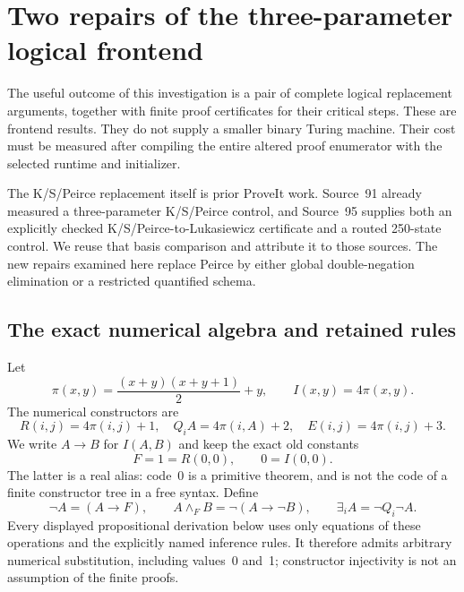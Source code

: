 \newcommand{\ksI}[2]{(#1\mathbin{\to}#2)}
\newcommand{\ksN}[1]{\neg #1}
\newcommand{\ksQ}[2]{Q_{#1}#2}
\newcommand{\ksD}[1]{\mathsf{D}(#1)}
\newcommand{\ksV}[2]{\mathsf{V}_{#1}(#2)}
\newcommand{\ksAnd}{\mathbin{\wedge_F}}

\section{Two repairs of the three-parameter logical frontend}
\label{sec:ksrepairs}

The useful outcome of this investigation is a pair of complete logical
replacement arguments, together with finite proof certificates for their
critical steps. These are frontend results. They do not supply a smaller
binary Turing machine. Their cost must be measured after compiling the
entire altered proof enumerator with the selected runtime and initializer.

The K/S/Peirce replacement itself is prior ProveIt work. Source~91 already
measured a three-parameter K/S/Peirce control, and Source~95 supplies both
an explicitly checked K/S/Peirce-to-Lukasiewicz certificate and a routed
250-state control. We reuse that basis comparison and attribute it to
those sources. The new repairs examined here replace Peirce by either
global double-negation elimination or a restricted quantified schema.

\subsection{The exact numerical algebra and retained rules}

Let
\[
 \pi(x,y)=\frac{(x+y)(x+y+1)}2+y,
 \qquad
 I(x,y)=4\pi(x,y).
\]
The numerical constructors are
\[
 R(i,j)=4\pi(i,j)+1,\quad
 Q_iA=4\pi(i,A)+2,\quad
 E(i,j)=4\pi(i,j)+3.
\]
We write $A\to B$ for $I(A,B)$ and keep the exact old constants
\[
 F=1=R(0,0),\qquad 0=I(0,0).
\]
The latter is a real alias: code~0 is a primitive theorem, and is not the
code of a finite constructor tree in a free syntax. Define
\[
 \neg A=(A\to F),\qquad
 A\ksAnd B=\neg(A\to\neg B),\qquad
 \exists_i A=\neg Q_i\neg A.
\]
Every displayed propositional derivation below uses only equations of
these operations and the explicitly named inference rules. It therefore
admits arbitrary numerical substitution, including values~0 and~1;
constructor injectivity is not an assumption of the finite proofs.

